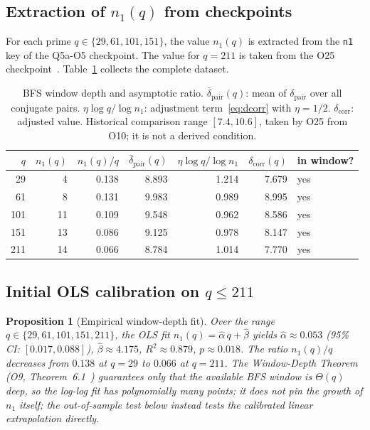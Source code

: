 \documentclass[11pt,a4paper]{article}
\newtheorem{proposition}[theorem]{Proposition}
\theoremstyle{definition}
\begin{document}
  \subsection{Extraction of \texorpdfstring{$n_1(q)$}{n1(q)} from checkpoints}

    For each prime $q \in \{29, 61, 101, 151\}$, the value $n_1(q)$ is extracted from the
    \texttt{n1} key of the Q5a-O5 checkpoint.
    The value for $q = 211$ is taken from the O25 checkpoint~\cite{Beau2026a29}.
    Table~\ref{tab:window} collects the complete dataset.

    \begin{table}[ht]
      \centering
      \caption{BFS window depth and asymptotic ratio.
        $\bar{\delta}_{\mathrm{pair}}(q)$: mean of $\delta_{\mathrm{pair}}$ over all conjugate pairs.
        $\eta \log q / \log n_1$: adjustment term~\eqref{eq:dcorr} with $\eta = 1/2$.
        $\delta_{\mathrm{corr}}$: adjusted value.
        Historical comparison range $[7.4, 10.6]$, taken by O25 from O10; it is not a derived condition.}
      \label{tab:window}
      \begin{tabular}{rrrrrrl}
        \toprule
        $q$ & $n_1(q)$ & $n_1(q)/q$ & $\bar{\delta}_{\mathrm{pair}}(q)$ &
        $\eta \log q / \log n_1$ & $\delta_{\mathrm{corr}}(q)$ & in window? \\
        \midrule
        29  & 4  & 0.138 & 8.893 & 1.214 & 7.679 & yes \\
        61  & 8  & 0.131 & 9.983 & 0.989 & 8.995 & yes \\
        101 & 11 & 0.109 & 9.548 & 0.962 & 8.586 & yes \\
        151 & 13 & 0.086 & 9.125 & 0.978 & 8.147 & yes \\
        211 & 14 & 0.066 & 8.784 & 1.014 & 7.770 & yes \\
        \bottomrule
      \end{tabular}
    \end{table}

  \subsection{Initial OLS calibration on \texorpdfstring{$q \le 211$}{q <= 211}}

    \begin{proposition}[Empirical window-depth fit]
      \label{prop:ols}
      Over the range $q \in \{29, 61, 101, 151, 211\}$, the OLS fit $n_1(q) = \hat\alpha\,q + \hat\beta$
      yields $\hat{\alpha} \approx 0.053$ (95\% CI: $[0.017, 0.088]$),
      $\hat{\beta} \approx 4.175$, $R^2 \approx 0.879$, $p \approx 0.018$.
      The ratio $n_1(q)/q$ decreases from $0.138$ at $q = 29$ to $0.066$ at $q = 211$.
      The Window-Depth Theorem (O9, Theorem~6.1~\cite{Beau2026a13}) guarantees only that the available
      BFS window is $\Theta(q)$ deep, so the log-log fit has polynomially many points; it does not pin
      the growth of $n_1$ itself; the out-of-sample test below instead tests the calibrated linear
      extrapolation directly.
    \end{proposition}
\end{document}
